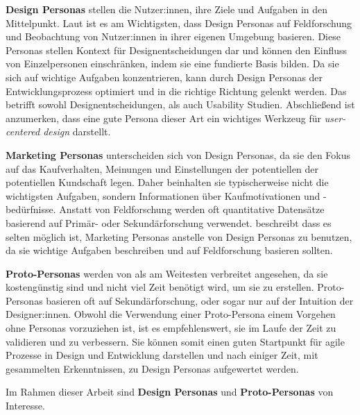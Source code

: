 \textbf{Design Personas} stellen die Nutzer:innen, ihre Ziele und Aufgaben in den Mittelpunkt. Laut
\textcite{tomlinUXOptimization2018} ist es am Wichtigsten, dass Design Personas auf Feldforschung
und Beobachtung von Nutzer:innen in ihrer eigenen Umgebung basieren. Diese Personas stellen Kontext
für Designentscheidungen dar und können den Einfluss von Einzelpersonen einschränken, indem sie eine
fundierte Basis bilden.  Da sie sich auf wichtige Aufgaben konzentrieren, kann
durch Design Personas der Entwicklungsprozess optimiert und in die richtige Richtung gelenkt werden.
Das betrifft sowohl Designentscheidungen, als auch Usability Studien. Abschließend ist anzumerken,
dass eine gute Persona dieser Art ein wichtiges Werkzeug für \textit{user-centered design}
darstellt. \parencite{tomlinUXOptimization2018}

\textbf{Marketing Personas} unterscheiden sich von Design Personas, da sie den Fokus auf das
Kaufverhalten, Meinungen und Einstellungen der potentiellen der potentiellen Kundschaft legen. Daher
beinhalten sie typischerweise nicht die wichtigsten Aufgaben, sondern Informationen über
Kaufmotivationen und -bedürfnisse. Anstatt von Feldforschung werden oft quantitative Datensätze
basierend auf Primär- oder Sekundärforschung verwendet. \textcite{tomlinUXOptimization2018}
beschreibt dass es selten möglich ist, Marketing Personas anstelle von Design Personas zu benutzen,
da sie wichtige Aufgaben beschreiben und auf Feldforschung basieren sollten.
\parencite{tomlinUXOptimization2018}

\textbf{Proto-Personas} werden von \textcite{tomlinUXOptimization2018} als am Weitesten verbreitet
angesehen, da sie kostengünstig sind und nicht viel Zeit benötigt wird, um sie zu erstellen.
Proto-Personas basieren oft auf Sekundärforschung, oder sogar nur auf der Intuition der
Designer:innen. Obwohl die Verwendung einer Proto-Persona einem Vorgehen ohne Personas vorzuziehen
ist, ist es empfehlenswert, sie im Laufe der Zeit zu validieren und zu verbessern. Sie können somit
einen guten Startpunkt für agile Prozesse in Design und Entwicklung darstellen und nach einiger
Zeit, mit gesammelten Erkenntnissen, zu Design Personas aufgewertet werden.
\parencite{tomlinUXOptimization2018}

Im Rahmen dieser Arbeit sind \textbf{Design Personas} und \textbf{Proto-Personas} von Interesse.

